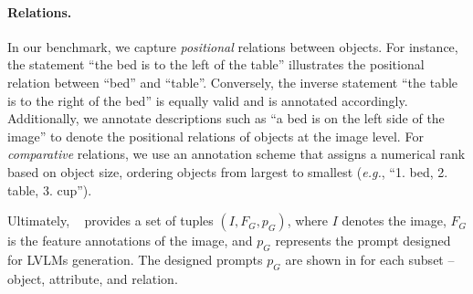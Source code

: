 \paragraph{Relations.} In our benchmark, we capture \textit{positional} relations between objects. For instance, the statement ``the bed is to the left of the table'' illustrates the positional relation between ``bed'' and ``table''. Conversely, the inverse statement ``the table is to the right of the bed'' is equally valid and is annotated accordingly. Additionally, we annotate descriptions such as ``a bed is on the left side of the image'' to denote the positional relations of objects at the image level. For \textit{comparative} relations, we use an annotation scheme that assigns a numerical rank based on object size, ordering objects from largest to smallest (\textit{e.g.}, ``1. bed, 2. table, 3. cup'').



Ultimately, \data~ provides a set of tuples $(I, F_G, p_G)$, where $I$ denotes the image, $F_G$ is the feature annotations of the image, and $p_G$ represents the prompt designed for LVLMs generation. The designed prompts $p_G$ are shown in   for each subset -- object, attribute, and relation.